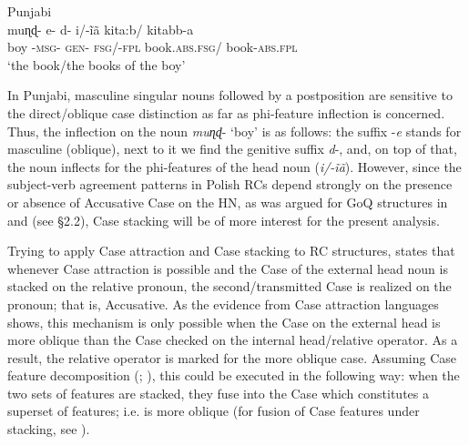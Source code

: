 \documentclass[output=paper]{langsci/langscibook}
\begin{document}
\ea%
         Punjabi \citep[316]{Manzini2015}\label{ex:leska:31}\\
    \gll muɳɖ- e-   d-   i/-\~iã     kita:b/      kitabb-a       \\
         boy   {}-\textsc{msg}{}- \textsc{gen}{}-   \textsc{fsg}/-\textsc{fpl}   book.\textsc{abs.fsg}/   book-\textsc{abs.fpl}\\
    \glt ‘the book/the books of the boy’                
\z

In Punjabi, masculine singular nouns followed by a postposition are sensitive to the direct\slash oblique case distinction as far as phi-feature inflection is concerned. Thus, the inflection on the noun \textit{muɳɖ}{}- ‘boy’ is as follows: the suffix -\textit{e} stands for masculine (oblique), next to it we find the genitive suffix \textit{d}{}-, and, on top of that, the noun inflects for the phi-features of the head noun (\textit{i/-\~iã}). However, since the subject-verb agreement patterns in Polish RCs depend strongly on the presence or absence of Accusative Case on the HN, as was argued for GoQ structures in \citet{Bošković2006} and \citealt{Witkoś2016} (see §2.2), Case stacking will be of more interest for the present analysis. 

Trying to apply Case attraction and Case stacking to RC structures, \citet{Łęska2016} states that whenever Case attraction is possible and the Case of the external head noun is stacked on the relative pronoun, the second/transmitted Case is realized on the pronoun; that is, Accusative. As the evidence from Case attraction languages shows, this mechanism is only possible when the Case on the external head is more oblique than the Case checked on the internal head/relative operator. As a result, the relative operator is marked for the more oblique case. Assuming Case feature decomposition (\citealt{Assmann2013}; \citealt{Georgi2014}), this could be executed in the following way: when the two sets of features are stacked, they fuse into the Case which constitutes a superset of features; i.e. is more oblique (for fusion of Case features under stacking, see \citealt{Assmann2014Stacking}).
\end{document}
